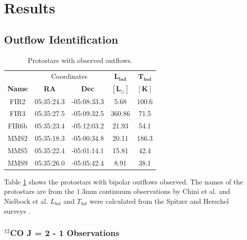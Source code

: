 \section{Results}


\subsection{Outflow Identification}

\begin{table}[h!]
	\caption{Protostars with observed outflows.}
	\label{table:protostars}
	\begin{center}
		\begin{tabular}{c|c|c|c|c}
			\toprule
			& \multicolumn{2}{c|}{Coordinates} & $\mathbf{L_{bol}}$ & $\mathbf{T_{bol}}$\\
			\textbf{Name} & \textbf{RA} & \textbf{Dec} & $\mathbf{[L_{\odot}]}$ & $\mathbf{[K]}$\\
			\midrule
			\centering
			FIR2 & 05:35:24.3 & -05:08:33.3 & 5.68 & 100.6\\
			FIR3 & 05:35:27.5 & -05:09:32.5 & 360.86 & 71.5\\
			FIR6b & 05:35:23.4 & -05:12:03.2 & 21.93 & 54.1\\
			MMS2 & 05:35:18.3 & -05:00:34.8 & 20.11 & 186.3\\
			MMS5 & 05:35:22.4 & -05:01:14.1 & 15.81 & 42.4\\
			MMS9 & 05:35:26.0 & -05:05:42.4 & 8.91 & 38.1\\
			\midrule
		\end{tabular}
	\end{center}
\end{table}

Table \ref{table:protostars} shows the protostars with bipolar outflows observed. The names of the protostars are from the $1.3\textrm{mm}$ continuum observations by Chini et al. \cite{chini1997dust} and Nielbock et al. \cite{nielbock2003stellar} $L_{bol}$ and $T_{bol}$ were calculated from the Spitzer and Herschel surveys \cite{megeath2012spitzer, furlan2016herschel}.

\newpage
\subsubsection{$^{12}$CO J = 2 - 1 Observations}

